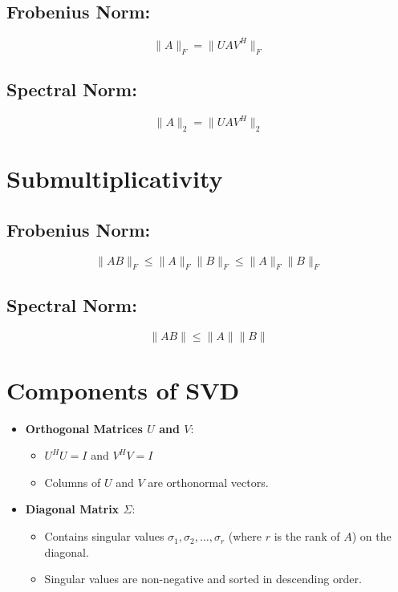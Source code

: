 \documentclass{article}
\begin{document}
\subsection*{Frobenius Norm:}
\[
\|A\|_F = \|UAV^H\|_F
\]

\subsection*{Spectral Norm:}
\[
\|A\|_2 = \|UAV^H\|_2
\]

\section*{Submultiplicativity}
\subsection*{Frobenius Norm:}
\[
\|AB\|_F \leq \|A\|_F \|B\|_F \leq \|A\|_F \|B\|_F
\]

\subsection*{Spectral Norm:}
\[
\|AB\| \leq \|A\| \|B\|
\]


\section*{Components of SVD}
\begin{itemize}
    \item \textbf{Orthogonal Matrices \( U \) and \( V \)}:
    \begin{itemize}
        \item \( U^H U = I \) and \( V^H V = I \)
        \item Columns of \( U \) and \( V \) are orthonormal vectors.
    \end{itemize}

    \item \textbf{Diagonal Matrix \( \Sigma \)}:
    \begin{itemize}
        \item Contains singular values \( \sigma_1, \sigma_2, \ldots, \sigma_r \) (where \( r \) is the rank of \( A \)) on the diagonal.
        \item Singular values are non-negative and sorted in descending order.
    \end{itemize}
\end{itemize}
\end{document}
